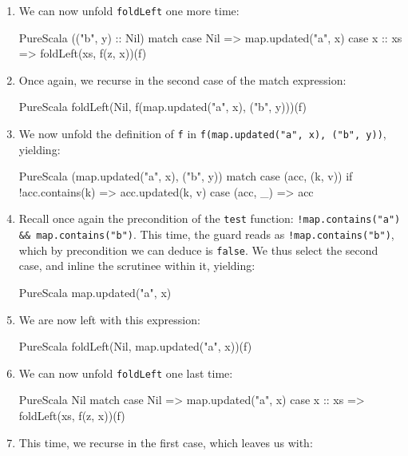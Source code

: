 \documentclass[a4paper,twoside]{article}
\newcommand{\InlineS}[1]{\lstinline[language=PureScala,basicstyle=\small\ttfamily,columns=fixed]|#1|}
\newcommand{\stt}[1]{\texttt{\small{#1}}}
\begin{document}
\begin{enumerate}
\item We can now unfold \stt{foldLeft} one more time:

\begin{ShortCode}{PureScala}
(("b", y) :: Nil) match {
  case Nil     => map.updated("a", x)
  case x :: xs => foldLeft(xs, f(z, x))(f)
}
\end{ShortCode}

\item Once again, we recurse in the second case of the match expression:

\begin{ShortCode}{PureScala}
foldLeft(Nil, f(map.updated("a", x), ("b", y)))(f)
\end{ShortCode}

\item We now unfold the definition of \stt{f} in \InlineS{f(map.updated("a", x), ("b", y))}, yielding:

\begin{ShortCode}{PureScala}
(map.updated("a", x), ("b", y)) match {
  case (acc, (k, v)) if !acc.contains(k) => acc.updated(k, v)
  case (acc, _)                          => acc
}
\end{ShortCode}

\item Recall once again the precondition of the \stt{test} function: \InlineS{!map.contains("a") && map.contains("b")}. This time, the guard reads as \InlineS{!map.contains("b")}, which by precondition we can deduce is \InlineS{false}. We thus select the second case, and inline the scrutinee within it, yielding:

\begin{ShortCode}{PureScala}
map.updated("a", x)
\end{ShortCode}

\item We are now left with this expression:

\begin{ShortCode}{PureScala}
foldLeft(Nil, map.updated("a", x))(f)
\end{ShortCode}

\item We can now unfold \stt{foldLeft} one last time:

\begin{ShortCode}{PureScala}
Nil match {
  case Nil     => map.updated("a", x)
  case x :: xs => foldLeft(xs, f(z, x))(f)
}
\end{ShortCode}

\item This time, we recurse in the first case, which leaves us with:


\end{enumerate}
\end{document}
